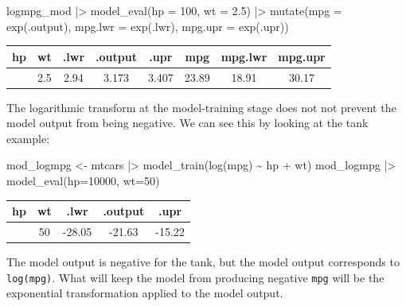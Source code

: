 \documentclass[
  letterpaper,
  DIV=11,
  numbers=noendperiod,
  oneside]{scrartcl}
\newenvironment{Shaded}{\begin{snugshade}}{\end{snugshade}}
\newcommand{\AttributeTok}[1]{\textcolor[rgb]{0.40,0.45,0.13}{#1}}
\newcommand{\DecValTok}[1]{\textcolor[rgb]{0.68,0.00,0.00}{#1}}
\newcommand{\FloatTok}[1]{\textcolor[rgb]{0.68,0.00,0.00}{#1}}
\newcommand{\FunctionTok}[1]{\textcolor[rgb]{0.28,0.35,0.67}{#1}}
\newcommand{\NormalTok}[1]{\textcolor[rgb]{0.00,0.23,0.31}{#1}}
\newcommand{\OtherTok}[1]{\textcolor[rgb]{0.00,0.23,0.31}{#1}}
\newcommand{\SpecialCharTok}[1]{\textcolor[rgb]{0.37,0.37,0.37}{#1}}
\begin{document}
\begin{Shaded}
\begin{Highlighting}[]
\NormalTok{logmpg\_mod }\SpecialCharTok{|\textgreater{}} \FunctionTok{model\_eval}\NormalTok{(}\AttributeTok{hp =} \DecValTok{100}\NormalTok{, }\AttributeTok{wt =} \FloatTok{2.5}\NormalTok{) }\SpecialCharTok{|\textgreater{}}
  \FunctionTok{mutate}\NormalTok{(}\AttributeTok{mpg =} \FunctionTok{exp}\NormalTok{(.output), }\AttributeTok{mpg.lwr =} \FunctionTok{exp}\NormalTok{(.lwr), }\AttributeTok{mpg.upr =} \FunctionTok{exp}\NormalTok{(.upr))}
\end{Highlighting}
\end{Shaded}

\begin{longtable}[]{@{}cccccccc@{}}
\toprule\noalign{}
hp & wt & .lwr & .output & .upr & mpg & mpg.lwr & mpg.upr \\
\midrule\noalign{}
\endhead
\bottomrule\noalign{}
\endlastfoot
100 & 2.5 & 2.94 & 3.173 & 3.407 & 23.89 & 18.91 & 30.17 \\
\end{longtable}

The logarithmic transform at the model-training stage does not not
prevent the model output from being negative. We can see this by looking
at the tank example:

\begin{Shaded}
\begin{Highlighting}[]
\NormalTok{mod\_logmpg }\OtherTok{\textless{}{-}}\NormalTok{ mtcars }\SpecialCharTok{|\textgreater{}} \FunctionTok{model\_train}\NormalTok{(}\FunctionTok{log}\NormalTok{(mpg) }\SpecialCharTok{\textasciitilde{}}\NormalTok{ hp }\SpecialCharTok{+}\NormalTok{ wt)}
\NormalTok{mod\_logmpg }\SpecialCharTok{|\textgreater{}} \FunctionTok{model\_eval}\NormalTok{(}\AttributeTok{hp=}\DecValTok{10000}\NormalTok{, }\AttributeTok{wt=}\DecValTok{50}\NormalTok{) }
\end{Highlighting}
\end{Shaded}

\begin{longtable}[]{@{}ccccc@{}}
\toprule\noalign{}
hp & wt & .lwr & .output & .upr \\
\midrule\noalign{}
\endhead
\bottomrule\noalign{}
\endlastfoot
10000 & 50 & -28.05 & -21.63 & -15.22 \\
\end{longtable}

The model output is negative for the tank, but the model output
corresponds to \texttt{log(mpg)}. What will keep the model from
producing negative \texttt{mpg} will be the exponential transformation
applied to the model output.
\end{document}
